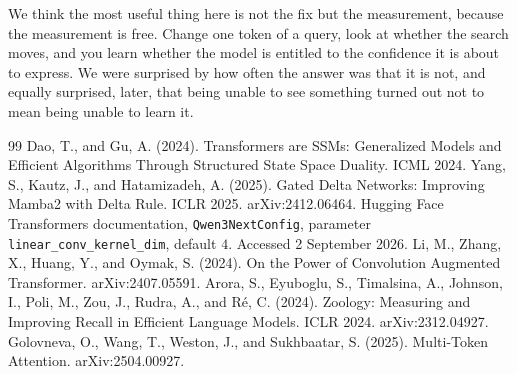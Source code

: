 \documentclass[10pt]{article}
\begin{document}
We think the most useful thing here is not the fix but the measurement, because the measurement is
free. Change one token of a query, look at whether the search moves, and you learn whether the model
is entitled to the confidence it is about to express. We were surprised by how often the answer was
that it is not, and equally surprised, later, that being unable to see something turned out not to
mean being unable to learn it.


\begin{thebibliography}{99}
 Dao, T., and Gu, A. (2024). Transformers are SSMs: Generalized Models and Efficient Algorithms Through Structured State Space Duality. ICML 2024.
 Yang, S., Kautz, J., and Hatamizadeh, A. (2025). Gated Delta Networks: Improving Mamba2 with Delta Rule. ICLR 2025. arXiv:2412.06464.
 Hugging Face Transformers documentation, \texttt{Qwen3NextConfig}, parameter \texttt{linear\_conv\_kernel\_dim}, default $4$. Accessed 2 September 2026.
 Li, M., Zhang, X., Huang, Y., and Oymak, S. (2024). On the Power of Convolution Augmented Transformer. arXiv:2407.05591.
 Arora, S., Eyuboglu, S., Timalsina, A., Johnson, I., Poli, M., Zou, J., Rudra, A., and R\'e, C. (2024). Zoology: Measuring and Improving Recall in Efficient Language Models. ICLR 2024. arXiv:2312.04927.
 Golovneva, O., Wang, T., Weston, J., and Sukhbaatar, S. (2025). Multi-Token Attention. arXiv:2504.00927.
\end{thebibliography}
\end{document}
